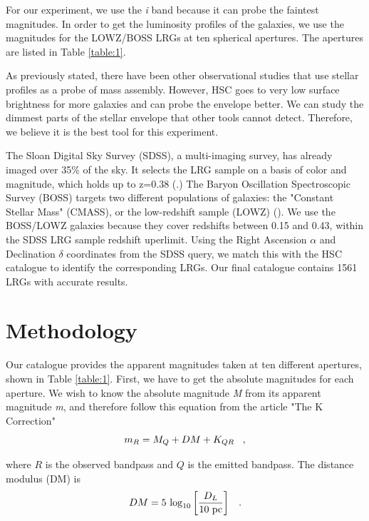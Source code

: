 \documentclass[apj]{emulateapj}
\begin{document}
For our experiment, we use the \textit{i} band because it can probe the faintest magnitudes. In order to get the luminosity profiles of the galaxies, we use the magnitudes for the LOWZ/BOSS LRGs at ten spherical apertures. The apertures are listed in Table \ref{table:1}.

As previously stated, there have been other observational studies that use stellar profiles as a probe of mass assembly. However, HSC goes to very low surface brightness for more galaxies and can probe the envelope better. We can study the dimmest parts of the stellar envelope that other tools cannot detect. Therefore, we believe it is the best tool for this experiment.

The Sloan Digital Sky Survey (SDSS), a multi-imaging survey, has already imaged over 35\% of the sky. It selects the LRG sample on a basis of color and magnitude, which holds up to z=0.38 (\cite{Eisenstein:2001}.) The Baryon Oscillation Spectroscopic Survey (BOSS) targets two different populations of galaxies: the "Constant Stellar Mass" (CMASS), or the low-redshift sample (LOWZ) (\cite{Cuesta:2015}). We use the BOSS/LOWZ galaxies because they cover redshifts between 0.15 and 0.43, within the SDSS LRG sample redshift uperlimit. Using the Right Ascension $\alpha$ and Declination $\delta$ coordinates from the SDSS query, we match this with the HSC catalogue to identify the corresponding LRGs. Our final catalogue contains 1561 LRGs with accurate results.

\section{Methodology}

Our catalogue provides the apparent magnitudes taken at ten different apertures, shown in Table \ref{table:1}. First, we have to get the absolute magnitudes for each aperture. We wish to know the absolute magnitude \textit{M} from its apparent magnitude \textit{m}, and therefore follow this equation from the article "The K Correction" \cite{Hogg:2002}
\begin{equation}
\small{
m_R=M _Q+ DM + K_{QR} \;\;\;,
}
\end{equation}

where $R$ is the observed bandpass and $Q$ is the emitted bandpass. The distance modulus (DM) is 
\begin{equation}
\small{
DM = 5\,\log_{10}\left[\frac{D_L}{10~\mathrm{pc}}\right] \;\;\;.
}
\end{equation}
\end{document}
